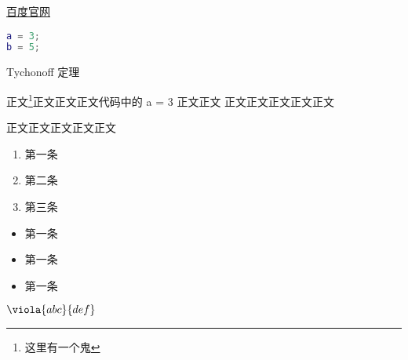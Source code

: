 

\begin{issues}
\issueDraft
\end{issues}

\href{http://www.baidu.com}{百度官网}


\begin{lstlisting}[language=matlab]
a = 3;
b = 5;
\end{lstlisting}

Tychonoff 定理 %

正文\footnote{这里有一个鬼}正文正文正文代码中的 a = 3 正文正文\cite{Cui1}
正文正文正文正文正文

正文正文正文正文正文

\begin{enumerate}
\item 第一条
\item 第二条
\item 第三条
\end{enumerate}

\begin{itemize}
\item 第一条
\item 第一条
\item 第一条
\end{itemize}

$\viola{abc}{def}$

